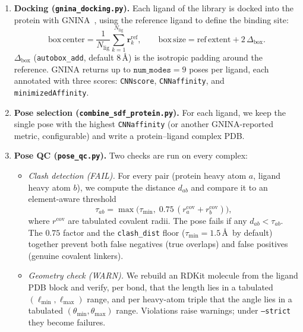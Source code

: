 \documentclass[11pt]{article}
\begin{document}
\begin{enumerate}[leftmargin=*, label=\textbf{(\arabic*)}]

  \item \textbf{Docking (\texttt{gnina\_docking.py}).}
  Each ligand of the library is docked into the protein with
  GNINA~\cite{GNINA}, using the reference ligand to define the binding
  site:
  \[
  \mathrm{box\,center} = \frac{1}{N_{\mathrm{lig}}}\sum_{k=1}^{N_{\mathrm{lig}}}
  \mathbf{r}_k^{\mathrm{ref}},
  \qquad
  \mathrm{box\,size} = \mathrm{ref\,extent} + 2\,\Delta_{\mathrm{box}}.
  \]
  $\Delta_{\mathrm{box}}$ (\texttt{autobox\_add}, default 8\,\AA) is the
  isotropic padding around the reference. GNINA returns up to
  $\texttt{num\_modes}=9$ poses per ligand, each annotated with three
  scores: \texttt{CNNscore}, \texttt{CNNaffinity}, and
  \texttt{minimizedAffinity}.

  \item \textbf{Pose selection (\texttt{combine\_sdf\_protein.py}).}
  For each ligand, we keep the single pose with the highest
  \texttt{CNNaffinity} (or another GNINA-reported metric, configurable)
  and write a protein--ligand complex PDB.

  \item \textbf{Pose QC (\texttt{pose\_qc.py}).}
  Two checks are run on every complex:

  \begin{itemize}[leftmargin=*]
    \item \emph{Clash detection (FAIL).} For every pair (protein heavy
    atom $a$, ligand heavy atom $b$), we compute the distance $d_{ab}$ and
    compare it to an element-aware threshold
    \[
    \tau_{ab} = \max\bigl(\tau_{\min},\; 0.75\,(r^{\mathrm{cov}}_a +
    r^{\mathrm{cov}}_b)\bigr),
    \]
    where $r^{\mathrm{cov}}$ are tabulated covalent radii. The pose fails
    if any $d_{ab} < \tau_{ab}$. The $0.75$ factor and the
    \texttt{clash\_dist} floor ($\tau_{\min}=1.5$\,\AA\ by default)
    together prevent both false negatives (true overlaps) and false
    positives (genuine covalent linkers).
    \item \emph{Geometry check (WARN).} We rebuild an RDKit molecule from
    the ligand PDB block and verify, per bond, that the length lies in a
    tabulated $(\ell_{\min},\ell_{\max})$ range, and per heavy-atom triple
    that the angle lies in a tabulated $(\theta_{\min},\theta_{\max})$
    range. Violations raise warnings; under \texttt{--strict} they become
    failures.
  \end{itemize}


\end{enumerate}
\end{document}
